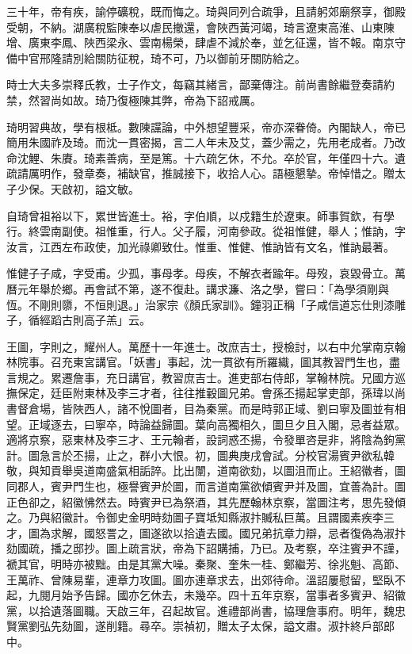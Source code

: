 \begin{pinyinscope}
{三十年，帝有疾，諭停礦稅，既而悔之。琦與同列合疏爭，且請躬郊廟祭享，御殿受朝，不納。湖廣稅監陳奉以虐民撤還，會陜西黃河竭，琦言遼東高淮、山東陳增、廣東李鳳、陜西梁永、雲南楊榮，肆虐不減於奉，並乞征還，皆不報。南京守備中官邢隆請別給關防征稅，琦不可，乃以御前牙關防給之。

時士大夫多崇釋氏教，士子作文，每竊其緒言，鄙棄傳注。前尚書餘繼登奏請約禁，然習尚如故。琦乃復極陳其弊，帝為下詔戒厲。

琦明習典故，學有根柢。數陳讜論，中外想望豐采，帝亦深眷倚。內閣缺人，帝已簡用朱國祚及琦。而沈一貫密揭，言二人年未及艾，蓋少需之，先用老成者。乃改命沈鯉、朱賡。琦素善病，至是篤。十六疏乞休，不允。卒於官，年僅四十六。遺疏請厲明作，發章奏，補缺官，推誠接下，收拾人心。語極懇摯。帝悼惜之。贈太子少保。天啟初，謚文敏。

自琦曾祖裕以下，累世皆進士。裕，字伯順，以戍籍生於遼東。師事賀欽，有學行。終雲南副使。祖惟重，行人。父子履，河南參政。從祖惟健，舉人；惟訥，字汝言，江西左布政使，加光祿卿致仕。惟重、惟健、惟訥皆有文名，惟訥最著。

惟健子子咸，字受甫。少孤，事母孝。母疾，不解衣者踰年。母歿，哀毀骨立。萬曆元年舉於鄉。再會試不第，遂不復赴。講求濂、洛之學，嘗曰：「為學須剛與恆。不剛則隳，不恒則退。」治家宗《顏氏家訓》。鐘羽正稱「子咸信道忘仕則漆雕子，循經蹈古則高子羔」云。

王圖，字則之，耀州人。萬歷十一年進士。改庶吉士，授檢討，以右中允掌南京翰林院事。召充東宮講官。「妖書」事起，沈一貫欲有所羅織，圖其教習門生也，盡言規之。累遷詹事，充日講官，教習庶吉士。進吏部右侍郎，掌翰林院。兄國方巡撫保定，廷臣附東林及李三才者，往往推轂圖兄弟。會孫丕揚起掌吏部，孫瑋以尚書督倉場，皆陜西人，諸不悅圖者，目為秦黨。而是時郭正域、劉曰寧及圖並有相望。正域逐去，曰寧卒，時論益歸圖。葉向高獨相久，圖旦夕且入閣，忌者益眾。適將京察，惡東林及李三才、王元翰者，設詞惑丕揚，令發單咨是非，將陰為鉤黨計。圖急言於丕揚，止之，群小大恨。初，圖典庚戌會試。分校官湯賓尹欲私韓敬，與知貢舉吳道南盛氣相詬誶。比出闈，道南欲劾，以圖沮而止。王紹徽者，圖同郡人，賓尹門生也，極譽賓尹於圖，而言道南黨欲傾賓尹并及圖，宜善為計。圖正色卻之，紹徽怫然去。時賓尹已為祭酒，其先歷翰林京察，當圖注考，思先發傾之。乃與紹徽計。令御史金明時劾圖子寶坻知縣淑抃贓私巨萬。且謂國素疾李三才，圖為求解，國怒詈之，圖遂欲以拾遺去國。國兄弟抗章力辯，忌者復偽為淑抃劾國疏，播之邸抄。圖上疏言狀，帝為下詔購捕，乃已。及考察，卒注賓尹不謹，褫其官，明時亦被黜。由是其黨大噪。秦聚、奎朱一桂、鄭繼芳、徐兆魁、高節、王萬祚、曾陳易輩，連章力攻圖。圖亦連章求去，出郊待命。溫詔屢慰留，堅臥不起，九閱月始予告歸。國亦乞休去，未幾卒。四十五年京察，當事者多賓尹、紹徽黨，以拾遺落圖職。天啟三年，召起故官。進禮部尚書，協理詹事府。明年，魏忠賢黨劉弘先劾圖，遂削籍。尋卒。崇禎初，贈太子太保，謚文肅。淑抃終戶部郎中。

}
\end{pinyinscope}
